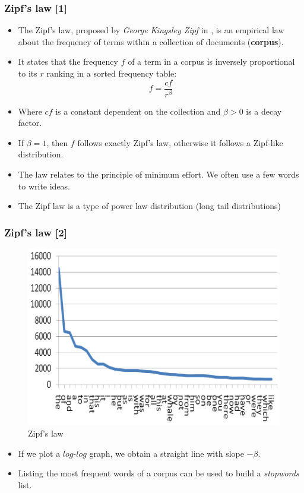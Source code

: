 \documentclass[handout]{beamer}
\begin{document}
\begin{frame}\frametitle{Zipf's law [1]}
\footnotesize{
\begin{itemize}
\item The Zipf's law, proposed by \emph{George Kingsley Zipf} in \cite{zipf1935}, is an empirical law about the frequency of terms within a collection of documents (\textbf{corpus}). 
\item It states that the frequency $f$ of a term in a corpus is inversely proportional to its $r$ ranking in a sorted frequency table:
\begin{equation}
	f = \frac{cf}{r^{\beta}}
\end{equation}
\item Where $cf$ is a constant dependent on the collection and $\beta > 0$ is a decay factor.
\item If $\beta = 1$, then $f$ follows exactly Zipf's law, otherwise it follows a Zipf-like distribution. 

\item The law relates to the principle of minimum effort. We often use a few words to write ideas.

\item The Zipf law is a type of power law distribution (long tail distributions)


\end{itemize}


}
 
\end{frame}


\begin{frame}\frametitle{Zipf's law [2]}
\footnotesize{

\begin{figure}[h!]
	\centering
	\includegraphics[scale=0.5]{pics/zipf1.png}
	\caption{Zipf's law}
\end{figure}
\begin{itemize}
 \item If we plot a $log$-$log$ graph, we obtain a straight line with slope  $-\beta$.
 \item Listing the most frequent words of a corpus can be used to build a \emph{stopwords} list. 
\end{itemize}
}



 
\end{frame}
\end{document}
